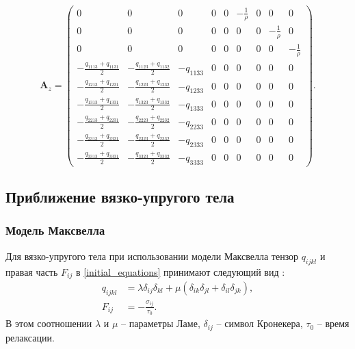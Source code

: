 \begin{displaymath}
\mathbf{A}_z =
\left( \begin{array}{cccccccccccc}
0 & 0 & 0 & 0 & 0 & -\frac 1 \rho & 0 & 0 & 0 \\ 
0 & 0 & 0 & 0 & 0 & 0 & 0 & -\frac 1 \rho & 0 \\ 
0 & 0 & 0 & 0 & 0 & 0 & 0 & 0 & -\frac 1 \rho \\ 
-\frac{q_{1113}+q_{1131}}{2} & -\frac{q_{1123}+q_{1132}}{2} & -q_{1133} & 0 & 0 & 0 & 0 & 0 & 0 \\ 
-\frac{q_{1213}+q_{1231}}{2} & -\frac{q_{1223}+q_{1232}}{2} & -q_{1233} & 0 & 0 & 0 & 0 & 0 & 0 \\ 
-\frac{q_{1313}+q_{1331}}{2} & -\frac{q_{1323}+q_{1332}}{2} & -q_{1333} & 0 & 0 & 0 & 0 & 0 & 0 \\ 
-\frac{q_{2213}+q_{2231}}{2} & -\frac{q_{2223}+q_{2232}}{2} & -q_{2233} & 0 & 0 & 0 & 0 & 0 & 0 \\ 
-\frac{q_{2313}+q_{2331}}{2} & -\frac{q_{2323}+q_{2332}}{2} & -q_{2333} & 0 & 0 & 0 & 0 & 0 & 0 \\ 
-\frac{q_{3313}+q_{3331}}{2} & -\frac{q_{3323}+q_{3332}}{2} & -q_{3333} & 0 & 0 & 0 & 0 & 0 & 0  
\end{array} \right).
\end{displaymath}


\clearpage
\newpage

\subsection{Приближение вязко-упругого тела}

\subsubsection{Модель Максвелла}
\label{viscosity_matrixes}

Для вязко-упругого тела при использовании модели Максвелла тензор $q_{ijkl}$ и правая часть $F_{ij}$ в \eqref{initial_equations} принимают следующий вид \cite{godunov_phys}:
\begin{align}
\label{tensor_qijkl_viscosity}
q_{ijkl}&=\lambda\delta_{ij}\delta_{kl}+\mu(\delta_{ik}\delta_{jl}+\delta_{il}
\delta_{jk}),\nonumber\\
F_{ij}&=-\frac{\sigma_{ij}}{\tau_0}.
\end{align}
В этом соотношении $\lambda$ и $\mu$ -- параметры Ламе, $\delta_{ij}$ -- символ Кронекера, $\tau_0$ -- время релаксации.


